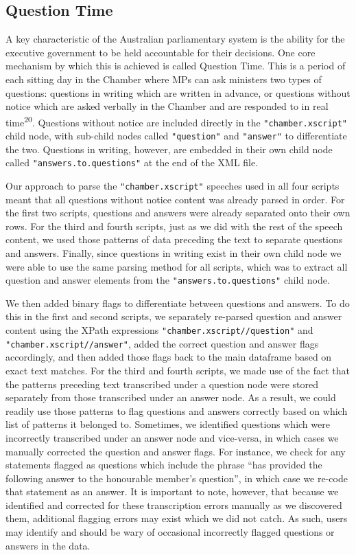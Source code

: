 \documentclass[
  letterpaper,
  DIV=11,
  numbers=noendperiod]{scrartcl}
\begin{document}
\hypertarget{sec-qa}{%
\subsection{Question Time}\label{sec-qa}}

A key characteristic of the Australian parliamentary system is the
ability for the executive government to be held accountable for their
decisions. One core mechanism by which this is achieved is called
Question Time. This is a period of each sitting day in the Chamber where
MPs can ask ministers two types of questions: questions in writing which
are written in advance, or questions without notice which are asked
verbally in the Chamber and are responded to in real
time\textsuperscript{20}. Questions without notice are included directly
in the \texttt{"chamber.xscript"} child node, with sub-child nodes
called \texttt{"question"} and \texttt{"answer"} to differentiate the
two. Questions in writing, however, are embedded in their own child node
called \texttt{"answers.to.questions"} at the end of the XML file.

Our approach to parse the \texttt{"chamber.xscript"} speeches used in
all four scripts meant that all questions without notice content was
already parsed in order. For the first two scripts, questions and
answers were already separated onto their own rows. For the third and
fourth scripts, just as we did with the rest of the speech content, we
used those patterns of data preceding the text to separate questions and
answers. Finally, since questions in writing exist in their own child
node we were able to use the same parsing method for all scripts, which
was to extract all question and answer elements from the
\texttt{"answers.to.questions"} child node.

We then added binary flags to differentiate between questions and
answers. To do this in the first and second scripts, we separately
re-parsed question and answer content using the XPath expressions
\texttt{"chamber.xscript//question"} and
\texttt{"chamber.xscript//answer"}, added the correct question and
answer flags accordingly, and then added those flags back to the main
dataframe based on exact text matches. For the third and fourth scripts,
we made use of the fact that the patterns preceding text transcribed
under a question node were stored separately from those transcribed
under an answer node. As a result, we could readily use those patterns
to flag questions and answers correctly based on which list of patterns
it belonged to. Sometimes, we identified questions which were
incorrectly transcribed under an answer node and vice-versa, in which
cases we manually corrected the question and answer flags. For instance,
we check for any statements flagged as questions which include the
phrase ``has provided the following answer to the honourable member's
question'', in which case we re-code that statement as an answer. It is
important to note, however, that because we identified and corrected for
these transcription errors manually as we discovered them, additional
flagging errors may exist which we did not catch. As such, users may
identify and should be wary of occasional incorrectly flagged questions
or answers in the data.
\end{document}
